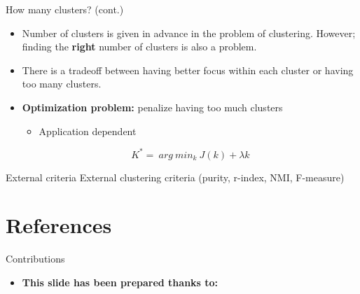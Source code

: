 \documentclass[serif, aspectratio=169]{beamer}
\begin{document}
\begin{frame}{How many clusters? (cont.)}
    \begin{itemize}
        \item Number of clusters is given in advance in the problem of clustering. However; finding the \textbf{right} number of clusters is also a problem.
        \item There is a tradeoff between having better focus within each cluster or having too many clusters.
        \item \textbf{Optimization problem:} penalize having too much clusters
        \begin{itemize}
            \item Application dependent
        \end{itemize}
        \[
        K^* = \ arg \ min_k \  J(k) + \lambda k 
        \]
    \end{itemize}
\end{frame}



\begin{frame}{External criteria}
    External clustering criteria (purity, r-index, NMI, F-measure)
\end{frame}

\section{References}

\begin{frame}{Contributions}
\begin{itemize}
\item \textbf{This slide has been prepared thanks to:}
\begin{itemize}
\end{itemize}
\end{itemize}

\end{frame}

\begin{frame}[allowframebreaks]
    
    
    \nocite{*}
\end{frame}
\end{document}
